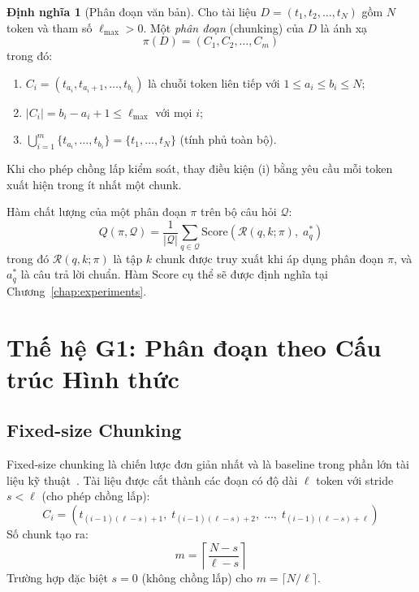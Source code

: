 \documentclass[12pt,a4paper]{report}
\theoremstyle{plain}
\theoremstyle{definition}
\newtheorem{dinhnghia}{Định nghĩa}[chapter]
\begin{document}
	\begin{dinhnghia}[Phân đoạn văn bản]
		\label{def:chunking}
		Cho tài liệu $D = (t_1, t_2, \ldots, t_N)$ gồm $N$ token và tham số
		$\ell_{\max} > 0$. Một \emph{phân đoạn} (chunking) của $D$ là ánh xạ
		\[
		\pi(D) = (C_1, C_2, \ldots, C_m)
		\]
		trong đó:
		\begin{enumerate}[label=(\roman*)]
			\item $C_i = (t_{a_i}, t_{a_i+1}, \ldots, t_{b_i})$ là chuỗi token
			liên tiếp với $1 \leq a_i \leq b_i \leq N$;
			\item $|C_i| = b_i - a_i + 1 \leq \ell_{\max}$ với mọi $i$;
			\item $\bigcup_{i=1}^{m} \{t_{a_i}, \ldots, t_{b_i}\} = \{t_1, \ldots, t_N\}$
			(tính phủ toàn bộ).
		\end{enumerate}
		Khi cho phép chồng lấp kiểm soát, thay điều kiện (i) bằng yêu cầu mỗi
		token xuất hiện trong ít nhất một chunk.
	\end{dinhnghia}
	
	Hàm chất lượng của một phân đoạn $\pi$ trên bộ câu hỏi $\mathcal{Q}$:
	\begin{equation}
		Q(\pi, \mathcal{Q}) = \frac{1}{|\mathcal{Q}|}
		\sum_{q \in \mathcal{Q}} \text{Score}\!\left(
		\mathcal{R}(q, k; \pi),\; a^*_q
		\right)
		\label{eq:chunking_quality}
	\end{equation}
	trong đó $\mathcal{R}(q, k; \pi)$ là tập $k$ chunk được truy xuất khi áp
	dụng phân đoạn $\pi$, và $a^*_q$ là câu trả lời chuẩn. Hàm $\text{Score}$
	cụ thể sẽ được định nghĩa tại Chương~\ref{chap:experiments}.
	
	\section{Thế hệ G1: Phân đoạn theo Cấu trúc Hình thức}
	\label{sec:g1}
	
	\subsection{Fixed-size Chunking}
	\label{subsec:fixed_size}
	
	Fixed-size chunking là chiến lược đơn giản nhất và là baseline trong phần
	lớn tài liệu kỹ thuật~\cite{lewis2020retrieval}. Tài liệu được cắt thành
	các đoạn có độ dài $\ell$ token với stride $s < \ell$ (cho phép chồng lấp):
	\begin{equation}
		C_i = (t_{(i-1)(\ell-s)+1},\; t_{(i-1)(\ell-s)+2},\; \ldots,\;
		t_{(i-1)(\ell-s)+\ell})
		\label{eq:fixed_chunks}
	\end{equation}
	Số chunk tạo ra:
	\begin{equation}
		m = \left\lceil \frac{N - s}{\ell - s} \right\rceil
		\label{eq:chunk_count}
	\end{equation}
	Trường hợp đặc biệt $s = 0$ (không chồng lấp) cho $m = \lceil N/\ell \rceil$.
	
\end{document}
